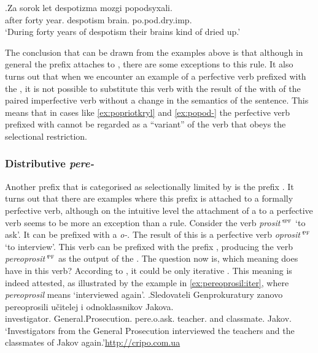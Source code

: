 \exg.\label{ex:popod-imp}Za sorok let despotizma mozgi popodsyxali.\\
after forty year. despotism brain. po.pod.dry.imp.\\
\trans `During forty years of despotism their brains kind of dried up.'

The conclusion that can be drawn from the examples above is that although in general the  prefix  attaches to , there are some exceptions to this rule. It also turns out that when we encounter an example of a perfective verb prefixed with the  , it is not possible to substitute this verb with the result of the  with  of the paired imperfective verb without a change in the semantics of the sentence. This means that in cases like \ref{ex:popriotkryl} and \ref{ex:popod-} the perfective verb prefixed with  cannot be regarded as a ``variant'' of the verb that obeys the selectional restriction.
 
\subsubsection{Distributive \textit{pere-}}
Another prefix that is categorised as selectionally limited by \citet{Tatevosov:09} is the  prefix . It turns out that there are examples where this prefix is attached to a formally perfective verb, although on the intuitive level the attachment of a   to a perfective verb seems to be more an exception than a rule. Consider the verb \textit{prosit'}$^{\textsc{ipf}}$ `to ask'. It can be prefixed with a  \textit{o-}. The result of this  is a perfective verb \textit{oprosit'}$^{\textsc{pf}}$ `to interview'. This verb can be prefixed with the prefix , producing the verb \textit{pereoprosit'}$^{\textsc{pf}}$ as the output of the . The question now is, which meaning does  have in this verb? According to \citet{Tatevosov:09}, it could be only iterative . This meaning is indeed attested, as illustrated by the example in \ref{ex:pereoprosil:iter}, where \textit{pereoprosil} means `interviewed again'.
\exg.\label{ex:pereoprosil:iter}Sledovateli Genprokuratury zanovo pereoprosili u\v{c}itelej i odnoklassnikov Jakova.\\
investigator. General.Prosecution.  pere.o.ask. teacher. and classmate. Jakov.\\
\trans `Investigators from the General Prosecution interviewed the teachers and the classmates of Jakov again.'\hbox{}\hfill\hbox{\url{http://cripo.com.ua}}


